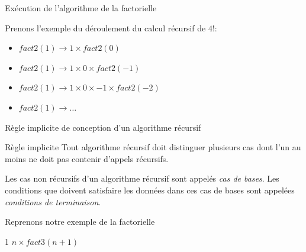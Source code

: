\documentclass[10pt,xcolor=dvipsnames]{beamer}
\begin{document}
\begin{frame}{Exécution de l'algorithme de la factorielle}

Prenons l'exemple du déroulement du calcul récursif de $4!$:
\begin{center}
    \begin{itemize}[<+->]
\item[] $fact2(1) \rightarrow 1 \times fact2(0)$
\item[] $fact2(1) \rightarrow 1 \times 0 \times fact2(-1)$
\item[] $fact2(1) \rightarrow 1 \times 0 \times -1 \times fact2(-2)$
\item[] $fact2(1) \rightarrow \ldots $
\end{itemize}
\end{center}

\end{frame}


\begin{frame}{Règle implicite de conception d'un algorithme récursif}
    \begin{exampleblock}{Règle implicite}
        Tout algorithme récursif doit distinguer plusieurs cas dont l'un au moins ne doit pas contenir d'appels récursifs.
    \end{exampleblock}
    
    Les cas non récursifs d'un algorithme récursif sont appelés \alert{\textit{cas de bases}}. Les conditions que doivent satisfaire les données dans ces cas de bases sont appelées \alert{\textit{conditions de terminaison}}.
    
\end{frame}

\begin{frame}{Reprenons notre exemple de la factorielle}
    
    \begin{tcolorbox}
  \begin{algorithmic}[1]
        \State{} 1
      \Else
        \State{} $n \times fact3(n+1)$
      \EndIf
    \EndFunction
  \end{algorithmic}
\end{tcolorbox}

\end{frame}
\end{document}
